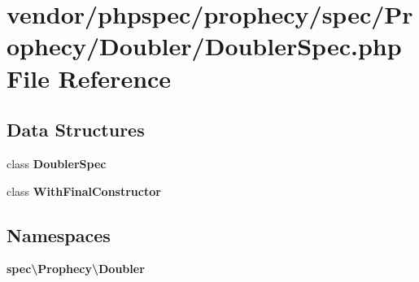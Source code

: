 \section{vendor/phpspec/prophecy/spec/\+Prophecy/\+Doubler/\+Doubler\+Spec.php File Reference}
\label{_doubler_spec_8php}
\subsection*{Data Structures}
\begin{DoxyCompactItemize}
\item 
class {\bf Doubler\+Spec}
\item 
class {\bf With\+Final\+Constructor}
\end{DoxyCompactItemize}
\subsection*{Namespaces}
\begin{DoxyCompactItemize}
\item 
 {\bf spec\textbackslash{}\+Prophecy\textbackslash{}\+Doubler}
\end{DoxyCompactItemize}
